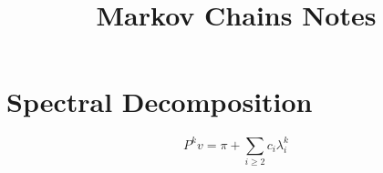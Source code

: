 \documentclass{article}
\title{Markov Chains Notes}
\author{}
\date{}
\begin{document}
\maketitle

\section{Spectral Decomposition}

\[
P^k v = \pi + \sum_{i\ge2} c_i \lambda_i^k
\]
\end{document}
